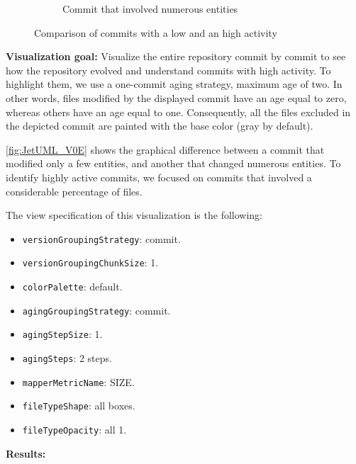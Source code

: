 \begin{figure}[t]
\begin{subfigure}{0.42\textwidth}
        \caption{Commit that involved numerous entities} \label{fig:JetUML_V0E1}
    \end{subfigure}
    \caption{Comparison of commits with a low and an high activity} 
    \label{fig:JetUML_V0E}
\end{figure}
\bigbreak
\textbf{Visualization goal:} Visualize the entire repository commit by commit to see how the repository evolved and understand commits with high activity. 
To highlight them, we use a one-commit aging strategy, maximum age of two. In other words, files modified by the displayed commit have an age equal to zero, whereas others have an age equal to one.
Consequently, all the files excluded in the depicted commit are painted with the base color (gray by default). 

\autoref{fig:JetUML_V0E} shows the graphical difference between a commit that modified only a few entities, and another that changed numerous entities. To identify highly active commits, we focused on commits that involved a considerable percentage of files.

The view specification of this visualization is the following:
\begin{itemize}
    \item \texttt{versionGroupingStrategy}: commit.
    \item \texttt{versionGroupingChunkSize}: 1. 
    \item \texttt{colorPalette}: default.
    \item \texttt{agingGroupingStrategy}: commit.
    \item \texttt{agingStepSize}: 1.
    \item \texttt{agingSteps}: 2 steps. 
    \item \texttt{mapperMetricName}: SIZE. 
    \item \texttt{fileTypeShape}: all boxes.
    \item \texttt{fileTypeOpacity}: all 1. 
\end{itemize}

\textbf{Results:}

